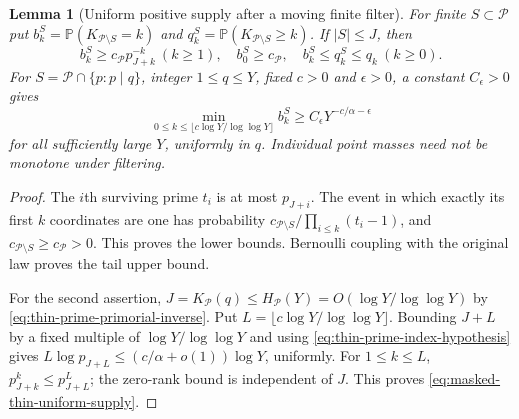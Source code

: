 \documentclass[11pt]{article}
\newtheorem{lemma}[theorem]{Lemma}
\theoremstyle{definition}
\begin{document}
\begin{lemma}[Uniform positive supply after a moving finite filter]
\label{lem:masked-thin-positive-supply}
For finite $S\subset\mathcal P$ put
$b_k^S=\mathbb P(K_{\mathcal P\setminus S}=k)$ and
$q_k^S=\mathbb P(K_{\mathcal P\setminus S}\ge k)$.
If $|S|\le J$, then
\begin{equation}
 b_k^S\ge c_{\mathcal P}p_{J+k}^{-k}\ (k\ge1),\quad
 b_0^S\ge c_{\mathcal P},\quad
 b_k^S\le q_k^S\le q_k\ (k\ge0).
 \label{eq:masked-thin-positive-supply}
\end{equation}
For $S=\mathcal P\cap\{p:p\mid q\}$, integer $1\le q\le Y$,
fixed $c>0$ and $\epsilon>0$, a constant $C_\epsilon>0$ gives
\begin{equation}
 \min_{0\le k\le\lfloor c\log Y/\log\log Y\rfloor}b_k^S
       \ge C_\epsilon Y^{-c/\alpha-\epsilon}
 \label{eq:masked-thin-uniform-supply}
\end{equation}
for all sufficiently large $Y$, uniformly in $q$.
Individual point masses need not be monotone under filtering.
\end{lemma}

\begin{proof}
The $i$th surviving prime $t_i$ is at most $p_{J+i}$.
The event in which exactly its first $k$ coordinates are one has
probability $c_{\mathcal P\setminus S}/\prod_{i\le k}(t_i-1)$,
and $c_{\mathcal P\setminus S}\ge c_{\mathcal P}>0$.
This proves the lower bounds.
Bernoulli coupling with the original law proves the tail upper bound.

For the second assertion,
$J=K_{\mathcal P}(q)\le H_{\mathcal P}(Y)
=O(\log Y/\log\log Y)$ by
\eqref{eq:thin-prime-primorial-inverse}.
Put $L=\lfloor c\log Y/\log\log Y\rfloor$.
Bounding $J+L$ by a fixed multiple of $\log Y/\log\log Y$
and using \eqref{eq:thin-prime-index-hypothesis} gives
$L\log p_{J+L}\le(c/\alpha+o(1))\log Y$, uniformly.
For $1\le k\le L$, $p_{J+k}^{k}\le p_{J+L}^{L}$;
the zero-rank bound is independent of $J$.
This proves \eqref{eq:masked-thin-uniform-supply}.
\end{proof}
\end{document}
